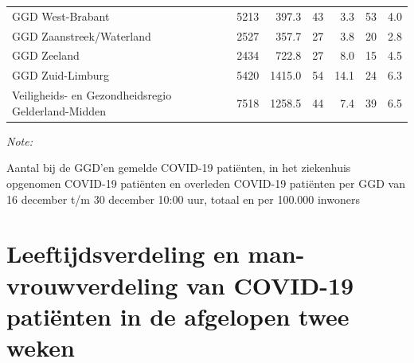 \documentclass[
  english,
  man,floatsintext]{apa6}
\begin{document}
\begin{table}[H]
\begin{threeparttable}
\begin{tabular}{lrrrrrr}
GGD West-Brabant & 5213 & 397.3 & 43 & 3.3 & 53 & 4.0\\
GGD Zaanstreek/Waterland & 2527 & 357.7 & 27 & 3.8 & 20 & 2.8\\
GGD Zeeland & 2434 & 722.8 & 27 & 8.0 & 15 & 4.5\\
GGD Zuid-Limburg & 5420 & 1415.0 & 54 & 14.1 & 24 & 6.3\\
Veiligheids- en Gezondheidsregio Gelderland-Midden & 7518 & 1258.5 & 44 & 7.4 & 39 & 6.5\\
\bottomrule
\end{tabular}
\begin{tablenotes}
\item \textit{Note: } 
\item Aantal bij de GGD’en gemelde COVID-19 patiënten, in het ziekenhuis opgenomen COVID-19 patiënten en overleden COVID-19 patiënten per GGD van 16 december t/m 30 december 10:00 uur, totaal en per 100.000 inwoners
\end{tablenotes}
\end{threeparttable}
\endgroup{}
\end{table}

\newpage

\hypertarget{leeftijdsverdeling-en-man-vrouwverdeling-van-covid-19-patiuxebnten-in-de-afgelopen-twee-weken}{%
\section{Leeftijdsverdeling en man-vrouwverdeling van COVID-19 patiënten in de afgelopen twee weken}\label{leeftijdsverdeling-en-man-vrouwverdeling-van-covid-19-patiuxebnten-in-de-afgelopen-twee-weken}}
\end{document}
